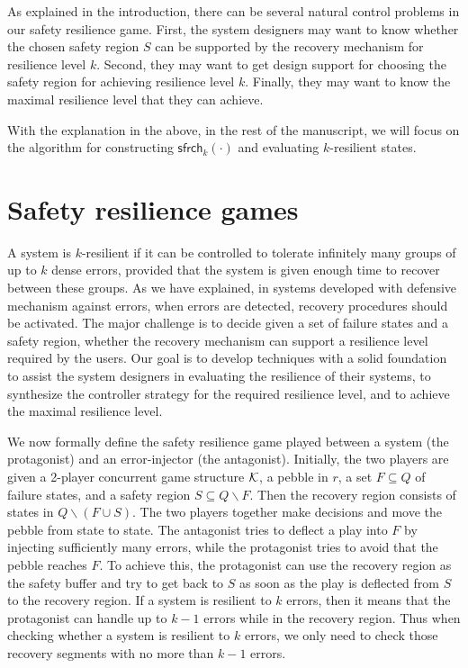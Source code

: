 \documentclass[times,10pt,twocolumn]{article}
\newcommand\safe{\mathsf{sfrch}}
\newcommand{\calk}{{\cal K}}
\begin{document}
As explained in the introduction, 
there can be several natural control problems in our safety resilience game.
First, the system designers may want to know whether the chosen safety region $S$ can 
be supported by the recovery mechanism for resilience level $k$.  
Second, they may want to get design support for choosing the safety region 
for achieving resilience level $k$.  
Finally, they may want to know the maximal resilience level that they can achieve. 


With the explanation in the above, in the rest of the manuscript, 
we will focus on the algorithm for constructing 
$\safe_k(\cdot)$ and evaluating $k$-resilient states. 




\section{Safety resilience games \label{sec.rgame}} 

A system is $k$-resilient if it
can be controlled to tolerate infinitely many groups of up to $k$ dense errors, 
provided that the system is given enough time to recover between these groups.
As we have explained, in systems developed with defensive mechanism against errors,  
when errors are detected, recovery procedures should be activated.  
The major challenge is to decide given a set of failure states and a safety region,
whether 
the recovery mechanism can support a resilience level required\label{reply1.prescribed.2.required} by the users. 
Our goal is to develop techniques with a solid foundation to 
assist the system designers in evaluating the resilience of their systems, 
to synthesize the controller strategy for the required resilience level, and 
to achieve the maximal resilience level. 


We now formally define the safety resilience game played between a 
system (the protagonist) and an error-injector (the antagonist).  
Initially, the two players are given a 2-player concurrent game structure $\calk$,  
a pebble in $r$,  
a set $F\subseteq Q$ of failure states, and 
a safety region $S\subseteq Q\smallsetminus F$. 
Then the recovery region consists of states in $Q\smallsetminus (F\cup S)$.  
The two players together make decisions and move the pebble from state to state.   
The antagonist tries to deflect a play into $F$ by injecting sufficiently many errors, while
the protagonist tries to avoid that the pebble reaches $F$. 
To achieve this, the protagonist can use the recovery region as the safety buffer and try to 
get back to $S$ as soon as the play is deflected from $S$ 
to the recovery region.  
If a system is resilient to $k$ errors, then it means that 
the protagonist can handle up to $k-1$ errors while in the recovery region.  
Thus when checking whether a system is resilient to $k$ errors, 
we only need to check those recovery segments with no more than $k-1$ errors. 
\end{document}
